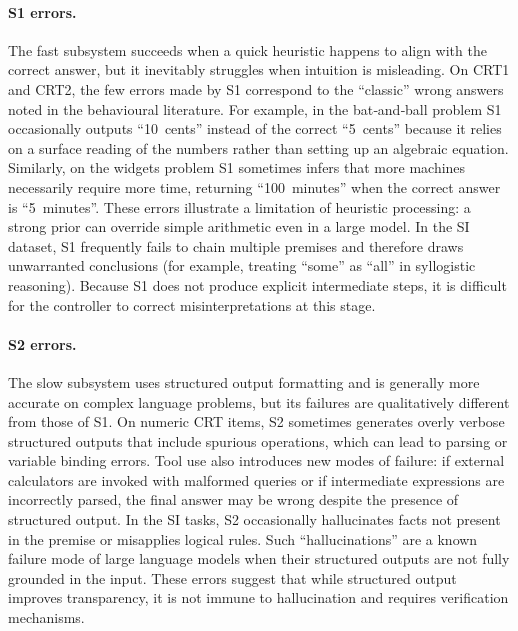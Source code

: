 \documentclass[11pt]{article}
\begin{document}
\paragraph{S1 errors.}  The fast subsystem succeeds when a quick
heuristic happens to align with the correct answer, but it inevitably
struggles when intuition is misleading.  On CRT1 and CRT2, the few
errors made by S1 correspond to the ``classic'' wrong answers noted in
the behavioural literature.  For example, in the bat‑and‑ball problem
S1 occasionally outputs ``10~cents'' instead of the correct ``5~cents''
because it relies on a surface reading of the numbers rather than
setting up an algebraic equation.  Similarly, on the widgets problem
S1 sometimes infers that more machines necessarily require more time,
returning ``100~minutes'' when the correct answer is ``5~minutes''.
These errors illustrate a limitation of heuristic processing: a strong
prior can override simple arithmetic even in a large model.  In the SI
dataset, S1 frequently fails to chain multiple premises and therefore
draws unwarranted conclusions (for example, treating ``some'' as ``all'' in
syllogistic reasoning).  Because S1 does not produce explicit
intermediate steps, it is difficult for the controller to correct
misinterpretations at this stage.

\paragraph{S2 errors.}  The slow subsystem uses structured output formatting and is generally more accurate on complex
language problems, but its failures are qualitatively different from
those of S1.  On numeric CRT items, S2 sometimes generates overly
verbose structured outputs that include spurious operations, which can
lead to parsing or variable binding errors.  Tool use also introduces new modes of
failure: if external calculators are invoked with malformed queries
or if intermediate expressions are incorrectly parsed, the final answer
may be wrong despite the presence of structured output.  In the SI
tasks, S2 occasionally hallucinates facts not present in the premise or
  misapplies logical rules.  Such ``hallucinations'' are a known failure mode
    of large language models when their structured outputs are not fully grounded
    in the input.  These errors suggest that while structured output improves
    transparency, it is not immune to hallucination and requires
    verification mechanisms.
\end{document}
